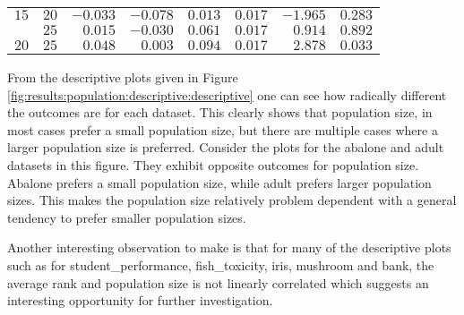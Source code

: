 \begin{table}[htbp]
{\begin{tabular}{lrrrrrrr}
                  $15$                 & $20$                 & $-0.033$             & $-0.078$                                        & $0.013$              & $0.017$              & $-1.965$             & $0.283$     \\
                  $ $                  & $25$                 & $0.015$              & $-0.030$                                        & $0.061$              & $0.017$              & $0.914$              & $0.892$     \\
                  $20$                 & $25$                 & $0.048$              & $0.003$                                         & $0.094$              & $0.017$              & $2.878$              & $0.033$     \\
                  \bottomrule
            \end{tabular}
      }
\end{table}

From the descriptive plots given in Figure \ref{fig:results:population:descriptive:descriptive} one can see how radically different the outcomes are for each dataset. This clearly shows that population size, in most cases prefer a small population size, but there are multiple cases where a larger population size is preferred. Consider the plots for the abalone and adult datasets in this figure. They exhibit opposite outcomes for population size. Abalone prefers a small population size, while adult prefers larger population sizes. This makes the population size relatively problem dependent with a general tendency to prefer smaller population sizes.

Another interesting observation to make is that for many of the descriptive plots such as for student\_performance, fish\_toxicity, iris, mushroom and bank, the average rank and population size is not linearly correlated which suggests an interesting opportunity for further investigation.


